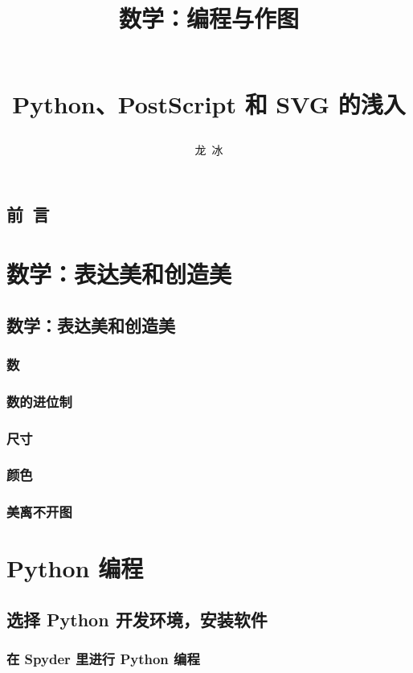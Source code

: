 \documentclass[zihao=-4,heading=true,a4paper,twoside,openany]{ctexbook}
\title{\begin{kaishu}数学：编程与作图\end{kaishu}\\
	Python、PostScript 和 SVG 的浅入}
\author{\kaishu 龙\,  冰}
\date{}
\begin{document}
\begin{titlepage}
	\maketitle
\end{titlepage}
\chapter*{\kaishu 前\, 言}\label{chap:preface}


\tableofcontents

\part{数学：表达美和创造美}\label{part:表达美和创造美}
\chapter{数学：表达美和创造美}\label{chap:1}
\section{数}
\section{数的进位制}
\section{尺寸}
\section{颜色}
\section{美离不开图}

\part{Python 编程}
\chapter{选择 Python 开发环境，安装软件}\label{chapII.1}
\section{在 Spyder 里进行 Python 编程}
\end{document}
